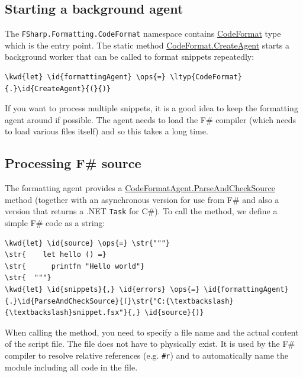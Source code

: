 \documentclass{article}
\newcommand{\id}[1]{\textcolor{black}{#1}}
\newcommand{\kwd}[1]{\textcolor{navy}{#1}}
\newcommand{\ops}[1]{\textcolor{purple}{#1}}
\newcommand{\str}[1]{\textcolor{olive}{#1}}
\begin{document}
\subsection*{Starting a background agent}



The \texttt{FSharp.Formatting.CodeFormat} namespace contains \href{https://fsprojects.github.io/FSharp.Formatting/reference/fsharp-formatting-codeformat-codeformat.html}{CodeFormat} type which is the
entry point. The static method \href{https://fsprojects.github.io/FSharp.Formatting/reference/fsharp-formatting-codeformat-codeformat.html\#CreateAgent}{CodeFormat.CreateAgent} starts a background worker that
can be called to format snippets repeatedly:
\begin{Verbatim}[commandchars=\\\{\}]
\kwd{let} \id{formattingAgent} \ops{=} \ltyp{CodeFormat}{.}\id{CreateAgent}{(}{)}
\end{Verbatim}



If you want to process multiple snippets, it is a good idea to keep the
formatting agent around if possible. The agent needs to load the F\# compiler
(which needs to load various files itself) and so this takes a long time.
\subsection*{Processing F\# source}



The formatting agent provides a \href{https://fsprojects.github.io/FSharp.Formatting/reference/fsharp-formatting-codeformat-codeformatagent.html}{CodeFormatAgent.ParseAndCheckSource} method (together with an asynchronous
version for use from F\# and also a version that returns a .NET \texttt{Task} for C\#).
To call the method, we define a simple F\# code as a string:
\begin{Verbatim}[commandchars=\\\{\}]
\kwd{let} \id{source} \ops{=} \str{"""}
\str{    let hello () =}
\str{      printfn "Hello world"}
\str{  """}
\kwd{let} \id{snippets}{,} \id{errors} \ops{=} \id{formattingAgent}{.}\id{ParseAndCheckSource}{(}\str{"C:{\textbackslash}{\textbackslash}snippet.fsx"}{,} \id{source}{)}
\end{Verbatim}



When calling the method, you need to specify a file name and the actual content
of the script file. The file does not have to physically exist. It is used by the
F\# compiler to resolve relative references (e.g. \texttt{\#r}) and to automatically name
the module including all code in the file.
\end{document}
